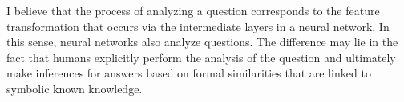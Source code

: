 I believe that the process of analyzing a question corresponds to the feature transformation that occurs via the intermediate layers in a neural network. In this sense, neural networks also analyze questions. The difference may lie in the fact that humans explicitly perform the analysis of the question and ultimately make inferences for answers based on formal similarities that are linked to symbolic known knowledge.





